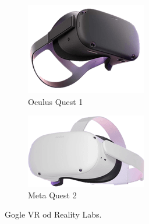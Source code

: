 \documentclass[a4paper,12pt,reqno]{article}
\begin{document}
\begin{figure}[!ht]%
	\centering
	\begin{subfigure}{.5\textwidth}
		\centering
		\includegraphics[width=0.8\linewidth]{graphics/oculusquest.png}
		\caption{Oculus Quest 1}	
		\label{ref:subref_a}
	\end{subfigure}%
	\begin{subfigure}{.5\textwidth}
		\centering
		\includegraphics[width=0.8\linewidth]{graphics/oculusquest2.png}
		\caption{Meta Quest 2}
		\label{ref:subref_b}
	\end{subfigure}%
	

\caption{Gogle VR od Reality Labs.}
\label{ref:ref}
\end{figure}
\end{document}
